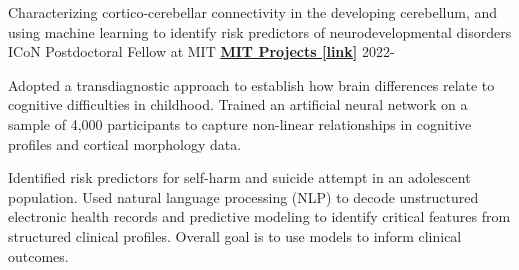 

\begin{cventries}

  \cventry
    {Characterizing cortico-cerebellar connectivity in the developing cerebellum, and using machine learning to identify risk predictors of neurodevelopmental disorders}
    {ICoN Postdoctoral Fellow at MIT} %
    {\href{https://maedbhk.github.io/MIT-Projects/}{\textbf{MIT Projects [link]}}}
    {2022-} %
    {
      \begin{cvitems} %
		\item {Adopted a transdiagnostic approach to establish how brain differences relate to cognitive difficulties in childhood. Trained an artificial neural network on a sample of 4,000 participants to capture non-linear relationships in cognitive profiles and cortical morphology data.}
		\item {Identified risk predictors for self-harm and suicide attempt in an adolescent population. Used natural language processing (NLP) to decode unstructured electronic health records and predictive modeling to identify critical features from structured clinical profiles. Overall goal is to use models to inform clinical outcomes.}
		\end{cvitems}
    }



\end{cventries}
